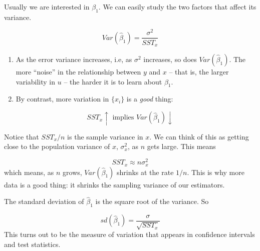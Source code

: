 \documentclass[notes=show]{beamer}
\begin{document}
\begin{frame}[plain]

 Usually we are interested in $\beta _{1}$. We can easily study the two factors that affect its variance.

 \begin{equation}
  Var(\hat{\beta}_{1})=\frac{\sigma ^{2}}{SST_{x}}
 \end{equation}
 
 \begin{enumerate}
  \item As the error variance increases, i.e, as $\sigma ^{2}$ increases, so does $Var(\hat{\beta}_{1})$. The more ``noise'' in the relationship between $y$ and $x$ -- that is, the larger variability in $u$ -- the harder it is to learn about $\beta _{1}$.

  \item By contrast, more variation in $\{x_{i}\}$ is a \textit{good} thing:

 \end{enumerate}

   \begin{equation}
    SST_{x}\uparrow \text{ implies }Var(\hat{\beta}_{1})\downarrow
   \end{equation}

\end{frame}

\begin{frame}[plain]

 Notice that $SST_{x}/n$ is the sample variance in $x$. We can think of this as getting close to the population variance of $x$, $\sigma _{x}^{2}$, as $n$ gets large. This means

 \begin{equation}
  SST_{x}\approx n\sigma _{x}^{2}
 \end{equation}
which means, as $n$ grows, $Var(\hat{\beta}_{1})$ shrinks at the rate $1/n$. This is why more data is a good thing: it shrinks the sampling variance of our estimators.\end{frame}

\begin{frame}[plain]
 The standard deviation of $\hat{\beta}_{1}$ is the square root of the variance. So

 \begin{equation}
  sd(\hat{\beta}_{1})=\frac{\sigma }{\sqrt{SST_{x}}}
 \end{equation}
 This turns out to be the measure of variation that appears in confidence intervals and test statistics.
\end{frame}
 
\end{document}
